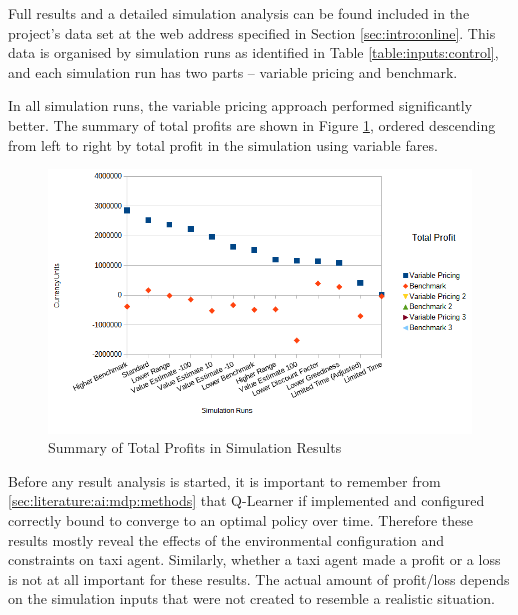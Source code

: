 Full results and a detailed simulation analysis can be found included in the
project's data set at the web address specified in Section
\ref{sec:intro:online}. This data is organised by simulation runs as identified
in Table \ref{table:inputs:control}, and each simulation run has two parts -- variable
pricing and benchmark.

In all simulation runs, the variable pricing approach performed significantly
better. The summary of total profits are shown in Figure
\ref{figure:results:total_profit}, ordered descending from left to right by
total profit in the simulation using variable fares.

\begin{figure}
\begin{center}
  \includegraphics[width=\textwidth]{../figures/total_profit}
  \caption{
    Summary of Total Profits in Simulation Results
    \label{figure:results:total_profit}
  }
\end{center}
\end{figure}


Before any result analysis is started, it is important to remember from
\ref{sec:literature:ai:mdp:methods} that Q-Learner if implemented and
configured correctly bound to converge to an optimal policy over time.
Therefore these results mostly reveal the effects of the environmental
configuration and constraints on taxi agent. Similarly, whether a taxi agent
made a profit or a loss is not at all important for these results. The actual
amount of profit/loss depends on the simulation inputs that were not created to
resemble a realistic situation.

